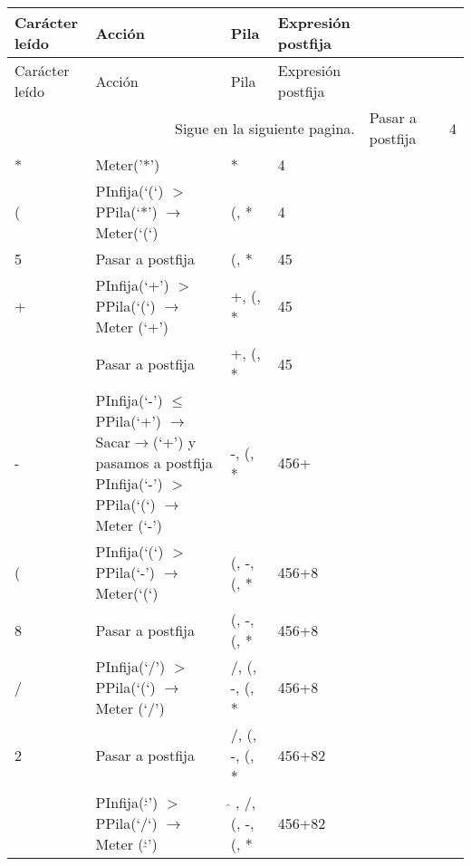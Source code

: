 \documentclass[12pt ]{article}
\begin{document}
 \begin{longtable}[h]{p{2cm} p{5cm} p{2.5cm} p{2.5 cm}}

        \hline

        \rowcolor{LightBlue2} Carácter leído &Acción& Pila&Expresión postfija  \\
        \hline\hline
        \endfirsthead

        \hline
        \rowcolor{LightBlue2} Carácter leído &Acción& Pila&Expresión postfija \\
        \hline\hline
        \endhead

        \multicolumn{4}{r}{Sigue en la siguiente pagina.}
        \endfoot

        \endlastfoot


        4 & Pasar a postfija & & 4 \\
        \rowcolor{gray!20}* &Meter('*')&*& 4 \\

        (&      PInfija(‘(‘) $>$ PPila(‘*’) $\rightarrow$ Meter(‘(‘) & (, *     & 4     \\
        \rowcolor{gray!20} 5&   Pasar a postfija & (, * & 45\\



        +&PInfija(‘+’) $>$ PPila(‘(‘) $\rightarrow$ Meter (‘+’) &+, (, *        &       45 \\
        \rowcolor{gray!20} &    Pasar a postfija&+, (, *        &45\\


        -& PInfija(‘-’) $\leq$ PPila(‘+’)
        $\rightarrow$ Sacar$\rightarrow$(‘+’) y pasamos a postfija
        PInfija(‘-’) $>$ PPila(‘(‘) $\rightarrow$ Meter (‘-’)   &       -, (, * & 456+  \\
        \rowcolor{gray!20}( & PInfija(‘(‘) $>$ PPila(‘-’) $\rightarrow$ Meter(‘(‘)      &(, -, (, *     &456+8\\


 8      &Pasar a postfija       &(, -, (, *     &456+8  \\
        \rowcolor{gray!20} /&   PInfija(‘/’) $>$ PPila(‘(‘) $\rightarrow$ Meter (‘/’) & /, (, -, (, *   &456+8\\


 2      & Pasar a postfija      & /, (, -, (, * &456+82 \\
        \rowcolor{gray!20}$\hat{{}}$ & PInfija(‘$\hat{{}}$’) $>$ PPila(‘/‘) $\rightarrow$ Meter (‘$\hat{{}}$’)  & $\hat{{}}$ , /, (, -, (, *    &456+82\\



\end{longtable}
\end{document}
